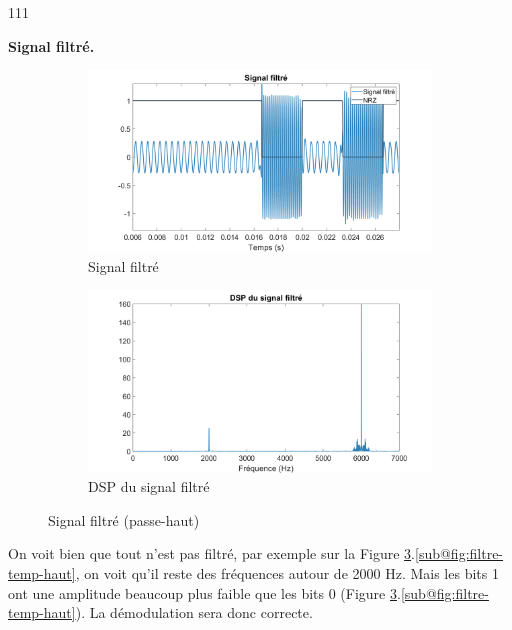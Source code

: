 \begin{dinglist}{111}
   \item \textbf{Signal filtré.}
   \begin{figure}[H]
      \centering
      \begin{subfigure}{0.5\textwidth}
         \centering
         \includegraphics[width=\textwidth]{partie-2/sous-partie-3/2.3.3.9.png}
         \caption{Signal filtré} \label{fig:filtre-temp-haut}
      \end{subfigure}%
      \begin{subfigure}{0.5\textwidth}
         \centering
         \includegraphics[width=\textwidth]{partie-2/sous-partie-3/2.3.3.10.png}
         \caption{DSP du signal filtré}\label{fig:filtre-freq-haut}
      \end{subfigure}
      \caption{Signal filtré (passe-haut) \label{fig:signal-filtre-haut}}
   \end{figure}
   On voit bien que tout n'est pas filtré, par exemple sur la Figure  \ref{fig:signal-filtre-haut}.\ref{sub@fig:filtre-temp-haut}, on voit qu'il reste des fréquences autour de 2000 Hz. Mais les bits 1 ont une amplitude beaucoup plus faible que les bits 0 (Figure \ref{fig:signal-filtre-haut}.\ref{sub@fig:filtre-temp-haut}). La démodulation sera donc correcte.
\end{dinglist}


